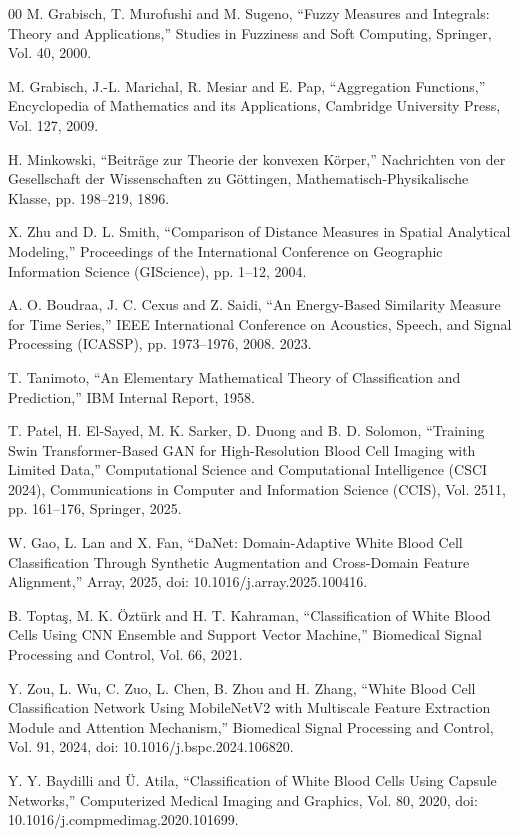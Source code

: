 \documentclass[12pt]{article}
\begin{document}
\begin{thebibliography}{00}
M. Grabisch, T. Murofushi and M. Sugeno,
``Fuzzy Measures and Integrals: Theory and Applications,''
Studies in Fuzziness and Soft Computing, Springer,
Vol. 40, 2000.

M. Grabisch, J.-L. Marichal, R. Mesiar and E. Pap,
``Aggregation Functions,''
Encyclopedia of Mathematics and its Applications, Cambridge University Press,
Vol. 127, 2009.

H. Minkowski,
``Beiträge zur Theorie der konvexen Körper,''
Nachrichten von der Gesellschaft der Wissenschaften zu Göttingen, 
Mathematisch-Physikalische Klasse, pp. 198--219, 1896.

X. Zhu and D. L. Smith,
``Comparison of Distance Measures in Spatial Analytical Modeling,''
Proceedings of the International Conference on Geographic Information Science (GIScience),
pp. 1--12, 2004.

A. O. Boudraa, J. C. Cexus and Z. Saidi,
``An Energy-Based Similarity Measure for Time Series,''
IEEE International Conference on Acoustics, Speech, and Signal Processing (ICASSP),
pp. 1973--1976, 2008.
2023.

T. Tanimoto,
``An Elementary Mathematical Theory of Classification and Prediction,''
IBM Internal Report, 1958.

T. Patel, H. El-Sayed, M. K. Sarker, D. Duong and B. D. Solomon,
``Training Swin Transformer-Based GAN for High-Resolution Blood Cell Imaging with Limited Data,''
Computational Science and Computational Intelligence (CSCI 2024),
Communications in Computer and Information Science (CCIS), Vol. 2511,
pp. 161--176, Springer, 2025.

W. Gao, L. Lan and X. Fan,
``DaNet: Domain-Adaptive White Blood Cell Classification Through Synthetic Augmentation and Cross-Domain Feature Alignment,''
Array,
2025, doi: 10.1016/j.array.2025.100416.

B. Toptaş, M. K. Öztürk and H. T. Kahraman,
``Classification of White Blood Cells Using CNN Ensemble and Support Vector Machine,''
Biomedical Signal Processing and Control,
Vol. 66, 2021.

Y. Zou, L. Wu, C. Zuo, L. Chen, B. Zhou and H. Zhang,
``White Blood Cell Classification Network Using MobileNetV2 with Multiscale Feature Extraction Module and Attention Mechanism,''
Biomedical Signal Processing and Control,
Vol. 91, 2024, doi: 10.1016/j.bspc.2024.106820.

Y. Y. Baydilli and Ü. Atila,
``Classification of White Blood Cells Using Capsule Networks,''
Computerized Medical Imaging and Graphics,
Vol. 80, 2020, doi: 10.1016/j.compmedimag.2020.101699.


\end{thebibliography}
\end{document}
